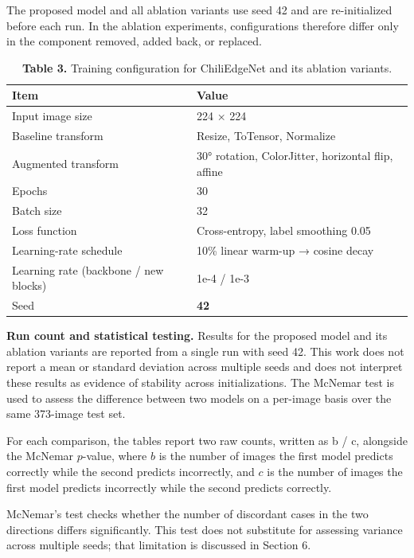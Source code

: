 The proposed model and all ablation variants use seed 42 and are re-initialized before each run. In the ablation experiments, configurations therefore differ only in the component removed, added back, or replaced.

\begin{table}[!tb]
\centering
\caption*{\textbf{Table 3.} Training configuration for ChiliEdgeNet and its ablation variants.}
\label{tab:3}
\small
\renewcommand{\arraystretch}{1.15}
\begin{tabular}{ll}
\toprule
\textbf{Item} & \textbf{Value} \\
\midrule
Input image size & 224 × 224 \\
Baseline transform & Resize, ToTensor, Normalize \\
Augmented transform & 30° rotation, ColorJitter, horizontal flip, affine \\
Epochs & 30 \\
Batch size & 32 \\
Loss function & Cross-entropy, label smoothing 0.05 \\
Learning-rate schedule & 10\% linear warm-up → cosine decay \\
Learning rate (backbone / new blocks) & 1e-4 / 1e-3 \\
Seed & \textbf{42} \\
\bottomrule
\end{tabular}
\end{table}

\textbf{Run count and statistical testing.} Results for the proposed model and its ablation variants are reported from a single run with seed 42. This work does not report a mean or standard deviation across multiple seeds and does not interpret these results as evidence of stability across initializations. The McNemar test is used to assess the difference between two models on a per-image basis over the same 373-image test set.

For each comparison, the tables report two raw counts, written as b / c, alongside the McNemar $p$-value, where $b$ is the number of images the first model predicts correctly while the second predicts incorrectly, and $c$ is the number of images the first model predicts incorrectly while the second predicts correctly.

McNemar's test checks whether the number of discordant cases in the two directions differs significantly. This test does not substitute for assessing variance across multiple seeds; that limitation is discussed in Section 6.

